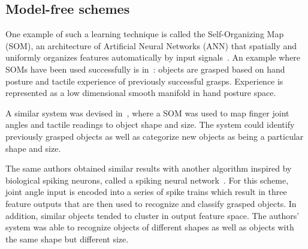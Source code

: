 \subsection{Model-free schemes}


One example of such a learning technique is called the Self-Organizing Map (SOM), an architecture of Artificial Neural Networks (ANN) that spatially and uniformly organizes features automatically by input signals~\cite{kohonen1990self}.
An example where SOMs have been used successfully is in~\cite{steffen2007experience}: objects are grasped based on hand posture and tactile experience of previously successful grasps.
Experience is represented as a low dimensional smooth manifold in hand posture space. 

A similar system was devised in~\cite{ratnasingam2011object}, where a SOM was used to map finger joint angles and tactile readings to object shape and size.
The system could identify previously grasped objects as well as categorize new objects as being a particular shape and size.

The same authors obtained similar results with another algorithm inspired by biological spiking neurons, called a spiking neural network~\cite{ratnasingam2011spiking}.
For this scheme, joint angle input is encoded into a series of spike trains which result in three feature outputs that are then used to recognize and classify grasped objects.
In addition, similar objects tended to cluster in output feature space.
The authors' system was able to recognize objects of different shapes as well as objects with the same shape but different size.

